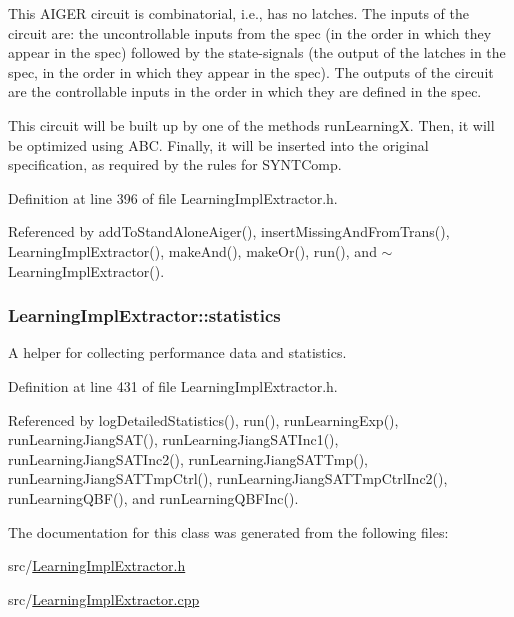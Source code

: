 This A\-I\-G\-E\-R circuit is combinatorial, i.\-e., has no latches. The inputs of the circuit are\-: the uncontrollable inputs from the spec (in the order in which they appear in the spec) followed by the state-\/signals (the output of the latches in the spec, in the order in which they appear in the spec). The outputs of the circuit are the controllable inputs in the order in which they are defined in the spec.

This circuit will be built up by one of the methods run\-Learning\-X. Then, it will be optimized using A\-B\-C. Finally, it will be inserted into the original specification, as required by the rules for S\-Y\-N\-T\-Comp. 

Definition at line 396 of file Learning\-Impl\-Extractor.\-h.



Referenced by add\-To\-Stand\-Alone\-Aiger(), insert\-Missing\-And\-From\-Trans(), Learning\-Impl\-Extractor(), make\-And(), make\-Or(), run(), and $\sim$\-Learning\-Impl\-Extractor().

\hypertarget{classLearningImplExtractor_a018564c4a67dfb228357008a8a50aef4}{
\subsubsection[{statistics}]{ Learning\-Impl\-Extractor\-::statistics\hspace{0.3cm}{\ttfamily [protected]}}}\label{classLearningImplExtractor_a018564c4a67dfb228357008a8a50aef4}


A helper for collecting performance data and statistics. 



Definition at line 431 of file Learning\-Impl\-Extractor.\-h.



Referenced by log\-Detailed\-Statistics(), run(), run\-Learning\-Exp(), run\-Learning\-Jiang\-S\-A\-T(), run\-Learning\-Jiang\-S\-A\-T\-Inc1(), run\-Learning\-Jiang\-S\-A\-T\-Inc2(), run\-Learning\-Jiang\-S\-A\-T\-Tmp(), run\-Learning\-Jiang\-S\-A\-T\-Tmp\-Ctrl(), run\-Learning\-Jiang\-S\-A\-T\-Tmp\-Ctrl\-Inc2(), run\-Learning\-Q\-B\-F(), and run\-Learning\-Q\-B\-F\-Inc().



The documentation for this class was generated from the following files\-:\begin{DoxyCompactItemize}
\item 
src/\hyperlink{LearningImplExtractor_8h}{Learning\-Impl\-Extractor.\-h}\item 
src/\hyperlink{LearningImplExtractor_8cpp}{Learning\-Impl\-Extractor.\-cpp}\end{DoxyCompactItemize}
